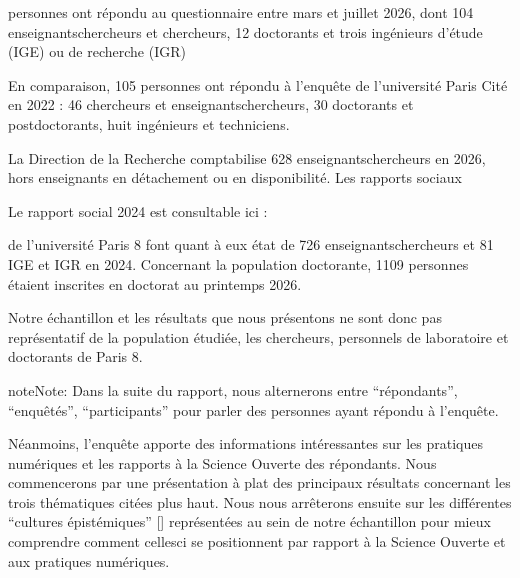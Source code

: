 \documentclass[letterpaper,10pt,english]{jupyterBook}
\begin{document}
 personnes ont répondu au questionnaire entre mars et juillet 2026, dont 104 enseignants\sphinxhyphen{}chercheurs et chercheurs, 12 doctorants et trois ingénieurs d’étude (IGE) ou de recherche (IGR)%
\begin{footnote}[2]\sphinxAtStartFootnote
En comparaison, 105 personnes ont répondu à l’enquête de l’université Paris Cité en 2022 : 46 chercheurs et enseignants\sphinxhyphen{}chercheurs, 30 doctorants et postdoctorants, huit ingénieurs et techniciens.
%
\end{footnote} La Direction de la Recherche comptabilise 628 enseignants\sphinxhyphen{}chercheurs en 2026, hors enseignants en détachement ou en disponibilité. Les rapports sociaux%
\begin{footnote}[3]\sphinxAtStartFootnote
Le rapport social 2024 est consultable ici : 
%
\end{footnote} de l’université Paris 8 font quant à eux état de 726 enseignants\sphinxhyphen{}chercheurs et 81 IGE et IGR en 2024. Concernant la population doctorante, 1109 personnes étaient inscrites en doctorat au printemps 2026.

\sphinxAtStartPar
Notre échantillon et les résultats que nous présentons ne sont donc pas représentatif de la population étudiée,  les chercheurs, personnels de laboratoire et doctorants de Paris 8.

\begin{sphinxShadowBox}
\sphinxstylesidebartitle{}

\begin{sphinxadmonition}{note}{Note:}
\sphinxAtStartPar
Dans la suite du rapport, nous alternerons entre “répondants”, “enquêtés”, “participants” pour parler des personnes ayant répondu à l’enquête.
\end{sphinxadmonition}
\end{sphinxShadowBox}

\sphinxAtStartPar
Néanmoins, l’enquête apporte des informations intéressantes sur les pratiques numériques et les rapports à la Science Ouverte des répondants. Nous commencerons par une présentation à plat des principaux résultats concernant les trois thématiques citées plus haut. Nous nous arrêterons ensuite sur les différentes “cultures épistémiques” {[}{]} représentées au sein de notre échantillon pour mieux comprendre comment celles\sphinxhyphen{}ci se positionnent par rapport à la Science Ouverte et aux pratiques numériques.
\end{document}
